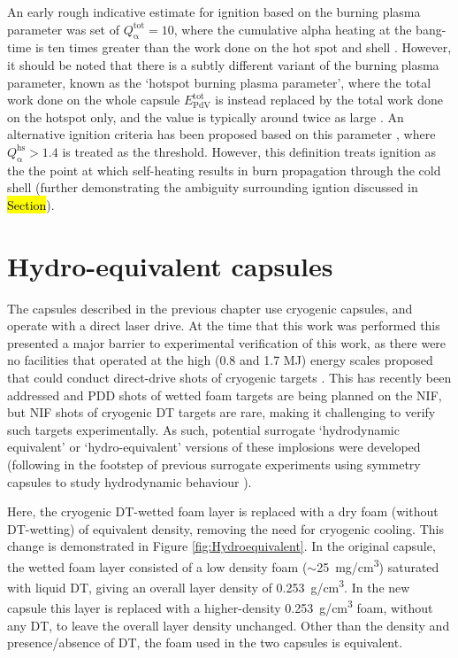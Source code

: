 An early rough indicative estimate for ignition based on the burning plasma parameter was set of $Q^\mathrm{{tot}}_{\mathrm{\alpha}} = 10$, where the cumulative alpha heating at the bang-time is ten times greater than the work done on the hot spot and shell \cite{Betti2011}. However, it should be noted that there is a subtly different variant of the burning plasma parameter, known as the `hotspot burning plasma parameter', where the total work done on the whole capsule $E^\mathrm{{tot}}_{\mathrm{PdV}}$ is instead replaced by the total work done on the hotspot only, and the value is typically around twice as large \cite{Betti2015}. An alternative ignition criteria has been proposed based on this parameter \cite{Christopherson2020}, where $Q^\mathrm{{hs}}_{\mathrm{\alpha}} > 1.4$ is treated as the threshold. However, this definition treats ignition as the the point at which self-heating results in burn propagation through the cold shell (further demonstrating the ambiguity surrounding igntion discussed in \hl{Section}).

\section{Hydro-equivalent capsules}
The capsules described in the previous chapter use cryogenic capsules, and operate with a direct laser drive. At the time that this work was performed this presented a major barrier to experimental verification of this work, as there were no facilities that operated at the high (0.8 and 1.7 MJ) energy scales proposed that could conduct direct-drive shots of cryogenic targets \cite{Hohenberger2015}. This has recently been addressed and PDD shots of wetted foam targets are being planned on the NIF, but NIF shots of cryogenic DT targets are rare, making it challenging to verify such targets experimentally. As such, potential surrogate `hydrodynamic equivalent' or `hydro-equivalent' versions of these implosions were developed (following in the footstep of previous surrogate experiments using symmetry capsules to study hydrodynamic behaviour \cite{Weber2016}). 

Here, the cryogenic DT-wetted foam layer is replaced with a dry foam (without DT-wetting) of equivalent density, removing the need for cryogenic cooling. This change is demonstrated in Figure \ref{fig:Hydroequivalent}. In the original capsule, the wetted foam layer consisted of a low density foam ($\sim$25~\si[per-mode=symbol]{\milli\gram\per\centi\meter\cubed}) saturated with liquid DT, giving an overall layer density of 0.253~\si[per-mode=symbol]{\gram\per\centi\meter\cubed}. In the new capsule this layer is replaced with a higher-density 0.253~\si[per-mode=symbol]{\gram\per\centi\meter\cubed} foam, without any DT, to leave the overall layer density  unchanged. Other than the density and presence/absence of DT, the foam used in the two capsules is equivalent.


